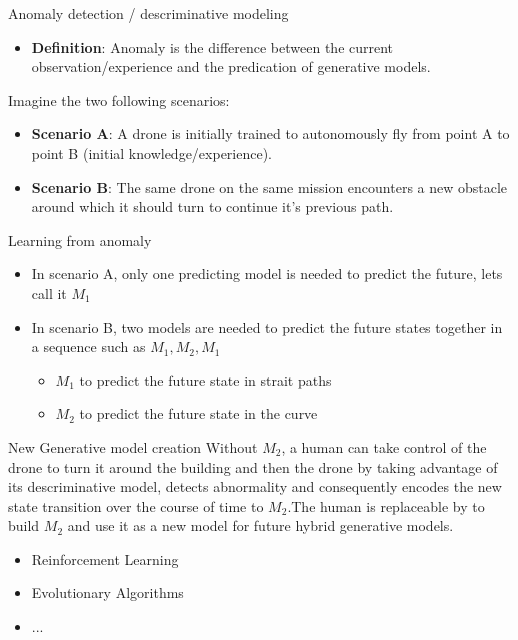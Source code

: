 \documentclass[unknownkeysallowed]{beamer}
\begin{document}
	\begin{frame}{Anomaly detection / descriminative modeling}
		\begin{itemize}
			\item \textbf{Definition}: Anomaly is the difference between the current observation/experience and the predication of generative models.
		\end{itemize}
		Imagine the two following scenarios:
		\begin{itemize}
			\item \textbf{Scenario A}: A drone is initially trained to autonomously fly from point A to point B (initial knowledge/experience).
			\item \textbf{Scenario B}: The same drone on the same mission encounters a new obstacle around which it should turn to continue it's previous path. 
		\end{itemize}
	\end{frame}

	\begin{frame}{Learning from anomaly}
		\begin{itemize}
			\item In scenario A, only one predicting model is needed to predict the future, lets call it $M_1$
			\item In scenario B, two models are needed to predict the future states together in a sequence such as ${M_1,M_2,M_1}$
				\begin{itemize}
					\item $M_1$ to predict the future state in strait paths
					\item $M_2$ to predict the future state in the curve
				\end{itemize}
		\end{itemize} 
	\end{frame}

	\begin{frame}{New Generative model creation}
		Without $M_2$, a human can take control of the drone to turn it around the building and then the drone by taking advantage of its descriminative model, detects abnormality and consequently encodes the new state transition over the course of time to $M_2$.The human is replaceable by to build $M_2$ and use it as a new model for future hybrid generative models.
		\begin{itemize}
			\item Reinforcement Learning
			\item Evolutionary Algorithms
			\item ...
		\end{itemize}
	\end{frame}
	
\end{document}
